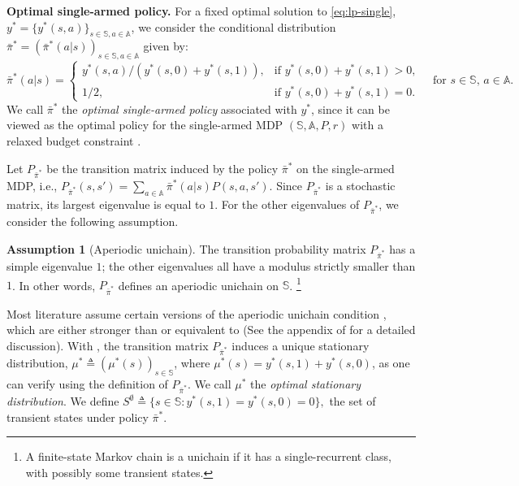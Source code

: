 \documentclass[11pt,letterpaper]{article}
\theoremstyle{plain}
\theoremstyle{definition}
\newtheorem{assumption}{Assumption}
\theoremstyle{remark}
\newcommand{\sspa}{\mathbb{S}}
\newcommand{\aspa}{\mathbb{A}}
\newcommand{\pibar}{{\sysbar{\pi}}}
\newcommand{\pibs}{{\pibar^*}}
\newcommand{\sysbar}[1]{\bar{#1}}
\newcommand{\sempty}{S^{\emptyset}}
\newcommand{\statdist}{\mu^*}
\begin{document}
\textbf{Optimal single-armed policy.} For a fixed optimal solution to \eqref{eq:lp-single}, $y^* = \{y^*(s, a)\}_{s\in\sspa,a\in\aspa}$, we consider the conditional distribution $\pibs = (\pibs(a|s))_{s\in\sspa, a\in\aspa}$ given by: 
\begin{equation}\label{eq:single-arm-opt-def}
    \pibs(a | s) =
    \begin{cases}
        y^*(s, a) / (y^*(s, 0) + y^*(s,1)), & \text{if } y^*(s, 0) + y^*(s,1) > 0,  \\
        1/2, &  \text{if } y^*(s, 0) + y^*(s,1) = 0.
    \end{cases}
    \quad \text{for $s\in\sspa$, $a\in\aspa$.}
\end{equation}
We call $\pibs$ the \emph{optimal single-armed policy} associated with $y^*$, since it can be viewed as the optimal policy for the single-armed MDP $(\sspa, \aspa, P, r)$ with a relaxed budget constraint \citep[][]{HonXieCheWan_24}. 



Let $P_{\pibs}$ be the transition matrix induced by the policy $\pibs$ on the single-armed MDP, i.e., $P_{\pibs}(s,s') = \sum\nolimits_{a\in\aspa} \pibs(a|s) P(s,a,s')$.  
Since $P_\pibs$ is a stochastic matrix, its largest eigenvalue is equal to $1$. For the other eigenvalues of $P_\pibs$, we consider the following assumption. 

\begin{assumption}[Aperiodic unichain]\label{assump:aperiodic-unichain}
    The transition probability matrix $P_\pibs$ has a simple eigenvalue $1$; the other eigenvalues all have a modulus strictly smaller than $1$. In other words, $P_\pibs$ defines an aperiodic unichain on $\sspa$. 
    \footnote{A finite-state Markov chain is a unichain if it has a single-recurrent class, with possibly some transient states.}
\end{assumption}


Most literature assume certain versions of the aperiodic unichain condition \citep{WebWei_90,Ver_16_verloop,GasGauYan_23_exponential,GasGauYan_23_whittles,HonXieCheWan_23,HonXieCheWan_24}, which are either stronger than or equivalent to  (See the appendix of \cite{HonXieCheWan_24} for a detailed discussion). 
With , the transition matrix $P_\pibs$ induces a unique stationary distribution, $\statdist \triangleq (\statdist(s))_{s\in\sspa}$, where $\statdist(s) = y^*(s,1) + y^*(s,0)$, as one can verify using the definition of $P_\pibs$. 
We call $\statdist$ the \emph{optimal stationary distribution}. We define $\sempty \triangleq \{s\in\sspa\colon y^*(s,1) = y^*(s,0) = 0\},$ the set of transient states under policy $\pibs.$ 
\end{document}
